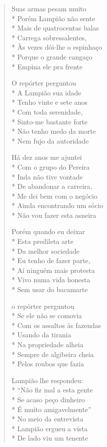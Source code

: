 \begin{verse}
Suas armas pesam muito\\*
Porém Lampião não sente\\*
Mais de quatrocentas balas\\*
Carrega sobressalentes,\\*
Às vezes dói-lhe o espinhaço\\*
Porque o grande cangaço\\*
Empina ele pra frente

O repórter perguntou\\*
A Lampião sua idade\\*
Tenho vinte e sete anos\\*
Com toda serenidade,\\*
Sinto-me bastante forte\\*
Não tenho medo da morte\\*
Nem fujo da autoridade

Há dez anos me ajuntei\\*
Com o grupo do Pereira\\*
Inda não tive vontade\\*
De abandonar a carreira,\\*
Me dei bem com o negócio\\*
Ainda encontrando um sócio\\*
Não vou fazer esta asneira

Porém quando eu deixar\\*
Esta predileta arte\\*
Da melhor sociedade\\*
Eu tenho de fazer parte,\\*
Aí ninguém mais protesta\\*
Vivo numa vida honesta\\*
Sem usar do bacamarte

o repórter perguntou\\*
Se ele não se comovia\\*
Com os assaltos às fazendas\\*
Usando da tirania\\*
Na propriedade alheia\\*
Sempre de algibeira cheia\\*
Pelos roubos que fazia

Lampião lhe respondeu:\\*
``Não fiz mal a esta gente\\*
Se acaso peço dinheiro\\*
É muito amigavelmente''\\*
No meio da entrevista\\*
Lampião ergueu a vista\\*
De lado viu um tenente


\end{verse}
